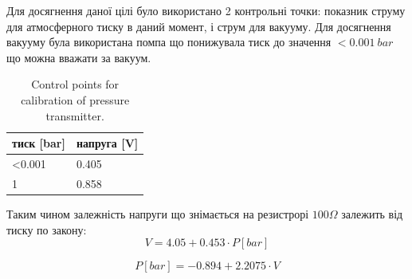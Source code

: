 \documentclass[pdftex,14pt]{scrartcl}
\begin{document}
	Для досягнення даної цілі було використано 2 контрольні точки: показник струму для атмосферного тиску в даний момент, і струм для вакууму. Для досягнення вакууму була використана помпа що понижувала тиск до значення $<0.001~bar$ що можна вважати за вакуум.
	
	\begin{table}[!h]
	\centering
	\caption{ Control points for calibration of pressure transmitter.}
	\begin{tabular}{|l|l|}
		\hline
		тиск [bar] & напруга [V] \\
		\hline
		<0.001 & 0.405\\
		\hline
		1 & 0.858\\
		\hline
	\end{tabular}
	\end{table}
	
	Таким чином залежність напруги що знімається на резистрорі $100\Omega$ залежить від тиску по закону:
	\begin{equation}
	V = 4.05 + 0.453 \cdot P[bar]
	\end{equation}

	\begin{equation}	
	P[bar] = -0.894 + 2.2075 \cdot V
	\end{equation}
\end{document}
